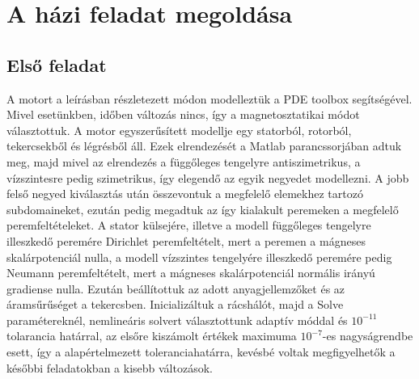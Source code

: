 \chapter{A házi feladat megoldása}
\section{Első feladat}
A motort a leírásban részletezett módon modelleztük a PDE toolbox segítségével. Mivel esetünkben, időben változás nincs, így a magnetosztatikai módot választottuk. A motor egyszerűsített modellje egy statorból, rotorból, tekercsekből és légrésből áll. Ezek elrendezését a Matlab parancssorjában adtuk meg, majd mivel az elrendezés a függőleges tengelyre antiszimetrikus, a vízszintesre pedig szimetrikus, így elegendő az egyik negyedet modellezni. A jobb felső negyed kiválasztás után összevontuk a megfelelő elemekhez tartozó subdomaineket, ezután pedig megadtuk az így kialakult peremeken a megfelelő peremfeltételeket. A stator külsejére, illetve a  modell függőleges tengelyre illeszkedő peremére Dirichlet peremfeltételt, mert a peremen a mágneses skalárpotenciál nulla, a modell vízszintes tengelyére illeszkedő peremére pedig Neumann peremfeltételt, mert a mágneses skalárpotenciál normális irányú gradiense nulla. Ezután beállítottuk az adott anyagjellemzőket és az áramsűrűséget a tekercsben. Inicializáltuk a rácshálót, majd a Solve paramétereknél, nemlineáris solvert választottunk adaptív móddal és $ 10^{-11} $ tolarancia határral, az elsőre kiszámolt értékek maximuma $ 10^{-7} $-es nagyságrendbe esett, így a alapértelmezett toleranciahatárra, kevésbé voltak megfigyelhetők a későbbi feladatokban a kisebb változások. 

